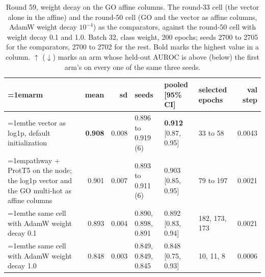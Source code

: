 \begin{table}[H]
  \centering
  \scriptsize
  \setlength{\tabcolsep}{2.5pt}
  \caption[Round 59, weight decay on the GO affine columns]{Round 59, weight decay on the GO affine columns. The round-33 cell (the vector alone in the affine) and the round-50 cell (GO and the vector as affine columns, AdamW weight decay $10^{-4}$) as the comparators, against the round-50 cell with weight decay 0.1 and 1.0. Batch 32, class weight, 200 epochs; seeds 2700 to 2705 for the comparators, 2700 to 2702 for the rest. Bold marks the highest value in a column. $\uparrow$ ($\downarrow$) marks an arm whose held-out AUROC is above (below) the first arm's on every one of the same three seeds.}
  \label{tab:w75}
  \begin{tabular}{@{}>{\raggedright\hangindent=1em\hangafter=1\arraybackslash}p{83.4mm}rrlllr@{}}
    \hline
    arm & mean & sd & seeds & pooled [95\% CI] & selected epochs & val step \\
    \hline
    the vector as log1p, default initialization & \textbf{0.908} & 0.008 & 0.896 to 0.919 (6) & \textbf{0.912} [0.87, 0.95] & 33 to 58 & 0.0043 \\
    pathway $+$ ProtT5 on the node; the log1p vector and the GO multi-hot as affine columns & 0.901 & 0.007 & 0.893 to 0.911 (6) & 0.903 [0.85, 0.95] & 79 to 197 & 0.0021 \\
    the same cell with AdamW weight decay 0.1 & 0.893 & 0.004 & 0.890, 0.898, 0.891 & 0.892 [0.83, 0.94] & 182, 173, 173 & 0.0021 \\
    the same cell with AdamW weight decay 1.0 & 0.848 & 0.003 & 0.849, 0.849, 0.845 & 0.848 [0.75, 0.93] & 10, 11, 8 & 0.0006 \\
    \hline
  \end{tabular}
\end{table}
